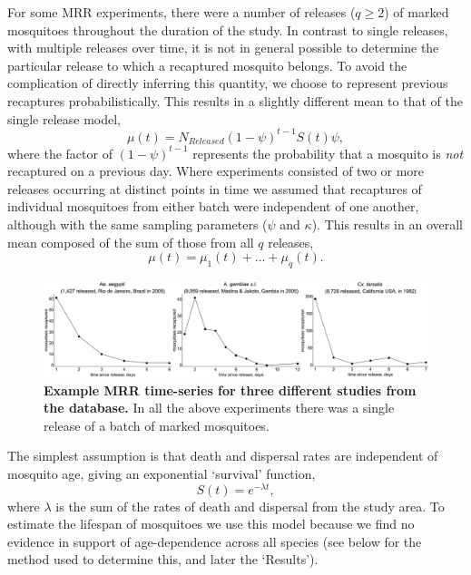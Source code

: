 \documentclass[12pt]{article}
\begin{document}
For some MRR experiments, there were a number of releases ($q\geq 2$) of marked mosquitoes throughout the duration of the study. In contrast to single releases, with multiple releases over time, it is not in general possible to determine the particular release to which a recaptured mosquito belongs. To avoid the complication of directly inferring this quantity, we choose to represent previous recaptures probabilistically. This results in a slightly different mean to that of the single release model,
%
\begin{equation}
\mu(t) = N_{Released}(1-\psi)^{t-1} S(t) \psi,
\end{equation}
%
where the factor of $(1-\psi)^{t-1}$ represents the probability that a mosquito is \textit{not} recaptured on a previous day. Where experiments consisted of two or more releases occurring at distinct points in time we assumed that recaptures of individual mosquitoes from either batch were independent of one another, although with the same sampling parameters ($\psi$ and $\kappa$). This results in an overall mean composed of the sum of those from all $q$ releases,
%
\begin{equation}
\mu(t) = \mu_1(t) + ... + \mu_q(t).
\end{equation}
%

\begin{figure}[h]
	\centerline{\includegraphics[width=1.25\textwidth]{./Figure_files/mrr_exampleMRRSeries.pdf}}
	\caption{\textbf{Example MRR time-series for three different studies from the \cite{guerra2014global} database.} In all the above experiments there was a single release of a batch of marked mosquitoes.}
	\label{fig:mrr_exampleMRRSeries}
\end{figure}

The simplest assumption is that death and dispersal rates are independent of mosquito age, giving an exponential `survival' function,
%
\begin{equation}
S(t) = e^{-\lambda t},
\end{equation}
%
where $\lambda$ is the sum of the rates of death and dispersal from the study area. To estimate the lifespan of mosquitoes we use this model because we find no evidence in support of age-dependence across all species (see below for the method used to determine this, and later the `Results').
\end{document}
